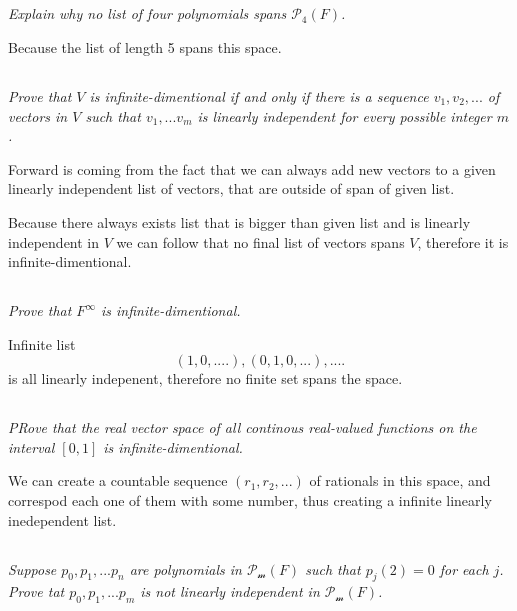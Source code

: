 \documentclass[11pt,oneside,titlepage]{book}
\begin{document}
\subsection{}
\textit{Explain why no list of four polynomials spans $\mathcal{P_4}(F)$.}

Because the list of length 5 spans this space.

\subsection{}
\textit{Prove that $V$ is infinite-dimentional if and only if there is a
  sequence $v_1, v_2, ... $ of vectors in $V$ such that $v_1, ... v_m$ is
  linearly independent for every possible integer $m$.}

Forward is coming from the fact that we can always add new vectors
to a given linearly independent list of vectors, that are outside of span
of given list.

Because there always exists list that is bigger than
given list and is linearly independent in $V$ we can follow that
no final list of vectors spans $V$, therefore it is infinite-dimentional.


\subsection{}
\textit{Prove that $F^{\infty}$ is infinite-dimentional.}

Infinite list
$$(1, 0, ....), (0, 1, 0, ...), .... $$
is all linearly indepenent, therefore no finite set spans the space.


\subsection{}
\textit{PRove that the real vector space of all continous real-valued
  functions on the interval $[0, 1]$ is infinite-dimentional.}

We can create a countable sequence $(r_1, r_2, ... )$ of rationals in this
space, and correspod each one of them with some number, thus creating a
infinite linearly inedependent list.

\subsection{}

\textit{Suppose $p_0, p_1, ... p_n$ are
  polynomials in $\mathcal{P_m}(F)$ such that
  $p_j(2) = 0$ for each $j$. Prove tat $p_0, p_1, ... p_m$ is not linearly
  independent in $\mathcal{P_m}(F)$.}
\end{document}

